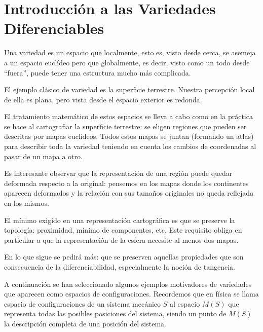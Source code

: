 \documentclass[../VD.tex]{subfiles}
\begin{document}
\setcounter{chapter}{-1}

\chapter[Introducción]{Introducción a las Variedades Diferenciables}
\label{chap:intro}

Una variedad es un espacio que localmente, esto es, visto desde cerca, se
asemeja a un espacio euclídeo pero que globalmente, es decir, visto como un todo
desde ``fuera'', puede tener una estructura mucho más complicada.

El ejemplo clásico de variedad es la superficie terrestre. Nuestra percepción
local de ella es plana, pero vista desde el espacio exterior es redonda.

El tratamiento matemático de estos espacios se lleva a cabo como en la práctica
se hace al cartografiar la superficie terrestre: se eligen regiones que pueden
ser descritas por mapas euclídeos. Todos estos mapas se juntan (formando un
atlas) para describir toda la variedad teniendo en cuenta los cambios de
coordenadas al pasar de un mapa a otro.

Es interesante observar que la representación de una región puede quedar
deformada respecto a la original: pensemos en los mapas donde los continentes
aparecen deformados y la relación con sus tamaños originales no queda reflejada
en los mismos.

El mínimo exigido en una representación cartográfica es que se preserve la
topología: proximidad, mínimo de componentes, etc. Este requisito obliga en
particular a que la representación de la esfera necesite al menos dos mapas.

En lo que sigue se pedirá más: que se preserven aquellas propiedades que son
consecuencia de la diferenciabilidad, especialmente la noción de tangencia.

A continuación se han seleccionado algunos ejemplos motivadores de variedades
que aparecen como espacios de configuraciones. Recordemos que en física se llama
espacio de configuraciones de un sistema mecánico $S$ al espacio $M(S)$ que
representa todas las posibles posiciones del sistema, siendo un punto de $M(S)$
la descripción completa de una posición del sistema.
\end{document}
